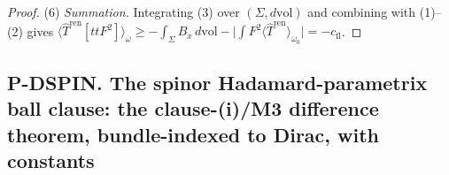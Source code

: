 \begin{proof}
(6) \emph{Summation.} Integrating (3) over
$(\Sigma,d\mathrm{vol})$ and combining with (1)--(2) gives
$\langle\widehat T^{\mathrm{ren}}[ttF^{2}]\rangle_\omega
\ge-\int_\Sigma B_x\,d\mathrm{vol}
-\big|\int F^{2}\langle\widehat T^{\mathrm{ren}}
\rangle_{\omega_0}\big|=-c_{\mathrm{fl}}$.
\end{proof}

%

\subsection*{P-DSPIN. The spinor Hadamard-parametrix ball clause: the
clause-(i)/M3 difference theorem, bundle-indexed to Dirac, with constants}

\providecommand{\Dsl}{\ensuremath{D\mkern-12mu/}}

